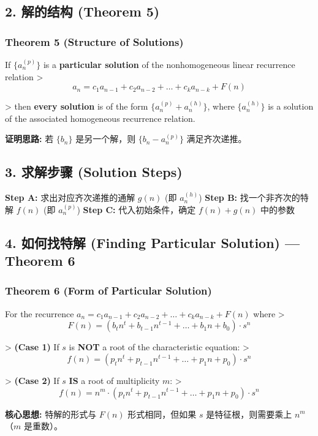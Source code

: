 \documentclass[10pt,a4paper,openany]{ctexbook}
\theoremstyle{definition}
\theoremstyle{remark}
\renewenvironment{quote}
  {\list{}{\leftmargin=1em\rightmargin=0pt\topsep=0.5pt\partopsep=0pt}\item[]}
  {\endlist}
\begin{document}
\vspace{-2pt}

\subsection{2. 解的结构 (Theorem 5)}

\subsubsection{Theorem 5 (Structure of Solutions)}

\begin{quote}
If $\{a_n^{(p)}\}$ is a \textbf{particular solution} of the nonhomogeneous linear recurrence relation
>
\[
a_n = c_1 a_{n-1} + c_2 a_{n-2} + \dots + c_k a_{n-k} + F(n)
\]

>
then \textbf{every solution} is of the form $\{a_n^{(p)} + a_n^{(h)}\}$, where $\{a_n^{(h)}\}$ is a solution of the associated homogeneous recurrence relation.

\textbf{证明思路:} 若 $\{b_n\}$ 是另一个解，则 $\{b_n - a_n^{(p)}\}$ 满足齐次递推。

\end{quote}
\vspace{-2pt}

\subsection{3. 求解步骤 (Solution Steps)}

\textbf{Step A:} 求出对应齐次递推的通解 $g(n)$ (即 $a_n^{(h)}$)
\textbf{Step B:} 找一个非齐次的特解 $f(n)$ (即 $a_n^{(p)}$)
\textbf{Step C:} 代入初始条件，确定 $f(n) + g(n)$ 中的参数
\vspace{-2pt}

\subsection{4. 如何找特解 (Finding Particular Solution) — Theorem 6}

\subsubsection{Theorem 6 (Form of Particular Solution)}

\begin{quote}
For the recurrence $a_n = c_1 a_{n-1} + c_2 a_{n-2} + \dots + c_k a_{n-k} + F(n)$ where
>
\[
F(n) = (b_t n^t + b_{t-1} n^{t-1} + \dots + b_1 n + b_0) \cdot s^n
\]

>
\textbf{(Case 1)} If $s$ is \textbf{NOT} a root of the characteristic equation:
>
\[
f(n) = (p_t n^t + p_{t-1} n^{t-1} + \dots + p_1 n + p_0) \cdot s^n
\]

>
\textbf{(Case 2)} If $s$ \textbf{IS} a root of multiplicity $m$:
>
\[
f(n) = n^m \cdot (p_t n^t + p_{t-1} n^{t-1} + \dots + p_1 n + p_0) \cdot s^n
\]


\textbf{核心思想:} 特解的形式与 $F(n)$ 形式相同，但如果 $s$ 是特征根，则需要乘上 $n^m$（$m$ 是重数）。

\end{quote}
\vspace{-2pt}
\end{document}
